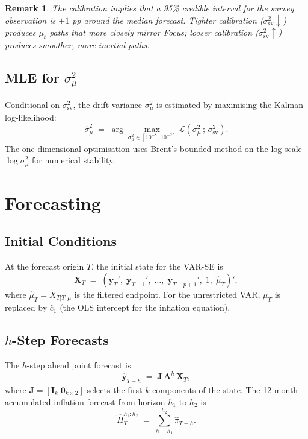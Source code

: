 \documentclass[12pt, a4paper]{article}
\newtheorem{remark}{Remark}
\newcommand{\bs}[1]{\boldsymbol{#1}}
\newcommand{\eye}{\mathbf{I}}
\begin{document}
\begin{remark}
    The calibration implies that a 95\% credible interval for the survey
    observation is $\pm 1$ pp around the median forecast. Tighter
    calibration ($\sigma^2_{\mathrm{sv}}\downarrow$) produces $\mu_t$
    paths that more closely mirror Focus; looser calibration
    ($\sigma^2_{\mathrm{sv}}\uparrow$) produces smoother, more inertial
    paths.
\end{remark}

\subsection{MLE for \texorpdfstring{$\sigma^2_\mu$}{sigma2\_mu}}

Conditional on $\sigma^2_{\mathrm{sv}}$, the drift variance $\sigma^2_\mu$
is estimated by maximising the Kalman log-likelihood:
\begin{equation}
    \hat{\sigma}^2_\mu \;=\; \arg\max_{\sigma^2_\mu \in [10^{-8},\,10^{-2}]}
    \mathcal{L}\!\left(\sigma^2_\mu\,;\,\sigma^2_{\mathrm{sv}}\right).
    \label{eq:mle}
\end{equation}
The one-dimensional optimisation uses Brent's bounded method on the
log-scale $\log\sigma^2_\mu$ for numerical stability.

\section{Forecasting}

\subsection{Initial Conditions}

At the forecast origin $T$, the initial state for the VAR-SE is
\begin{equation}
    \bs{X}_T \;=\; \left(\bs{y}_T',\;\bs{y}_{T-1}',\;\ldots,\;\bs{y}_{T-p+1}',\;1,\;\hat\mu_T\right)',
\end{equation}
where $\hat\mu_T = X_{T|T,\mu}$ is the filtered endpoint. For the
unrestricted VAR, $\mu_T$ is replaced by $\hat{c}_1$ (the OLS intercept for
the inflation equation).

\subsection{$h$-Step Forecasts}

The $h$-step ahead point forecast is
\begin{equation}
    \widehat{\bs{y}}_{T+h} \;=\; \bs{J}\,\bs{A}^h\,\bs{X}_T,
\end{equation}
where $\bs{J} = [\eye_k\;\bs{0}_{k\times 2}]$ selects the first $k$
components of the state. The 12-month accumulated inflation forecast from
horizon $h_1$ to $h_2$ is
\begin{equation}
    \widehat{\Pi}_{T}^{h_1:h_2} \;=\; \sum_{h=h_1}^{h_2}\widehat{\pi}_{T+h}.
    \label{eq:accum}
\end{equation}
\end{document}
